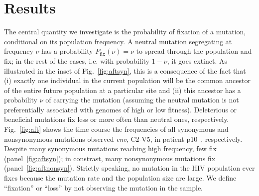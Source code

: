 \documentclass[rmp, twocolumn]{revtex4}
\newcommand{\pfix}{P_{\mathrm{fix}}}
\newcommand{\FIG}[1]{Fig.~\ref{fig:#1}}
\newcommand{\env}{\textit{env}}
\newcommand{\shankaregion}{C2-V5}
\begin{document}
\section{Results}
The central quantity we investigate is the probability of fixation of a
mutation, conditional on its population frequency. A neutral mutation
segregating at frequency $\nu$ has a probability $\pfix(\nu) = \nu$ to
spread through the population and fix; in the rest of the cases, i.e. with
probability $1-\nu$, it goes extinct. As illustrated in the inset of
\FIG{aftsyn}, this is a  consequence of the fact that (i) exactly one
individual in the current population will be the common ancestor of the entire
future population at a particular site and (ii) this ancestor has a probability
$\nu$ of carrying the mutation (assuming the neutral mutation is not
preferentially associated with genomes of high or low fitness). Deleterious or
beneficial mutations fix less or more often than neutral ones, respectively.
\FIG{aft} shows the time course the frequencies of all synonymous and
nonsynonymous mutations observed \env, \shankaregion, in patient
p10~\citep{shankarappa_consistent_1999}, respectively. Despite many synonymous
mutations reaching high frequency, few fix (panel~\ref{fig:aftsyn}); in
constrast, many nonsynonymous mutations fix (panel~\ref{fig:aftnonsyn}).
Strictly speaking, no mutation in the HIV population ever fixes because the 
mutation rate and the population size are large. We define ``fixation'' or ``loss''
by not observing the mutation in the sample.

\end{document}
